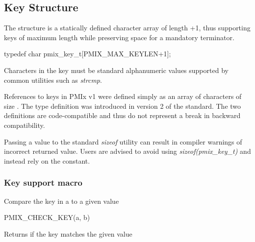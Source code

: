 \subsection{Key Structure}

The  structure is a statically defined character array of length +1, thus supporting keys of maximum length  while preserving space for a mandatory  terminator.

\cspecificstart
\begin{codepar}
typedef char pmix_key_t[PMIX_MAX_KEYLEN+1];
\end{codepar}
\cspecificend

Characters in the key must be standard alphanumeric values supported by common utilities such as \textit{strcmp}.

\adviceuserstart
References to keys in \ac{PMIx} v1 were defined simply as an array of characters of size . The  type definition was introduced in version 2 of the standard. The two definitions are code-compatible and thus do not represent a break in backward compatibility.

Passing a  value to the standard \textit{sizeof} utility can result in compiler warnings of incorrect returned value. Users are advised to avoid using \textit{sizeof(pmix_key_t)} and instead rely on the  constant.
\adviceuserend

\subsubsection{Key support macro}

Compare the key in a  to a given value

\cspecificstart
\begin{codepar}
PMIX_CHECK_KEY(a, b)
\end{codepar}
\cspecificend

\begin{arglist}
\end{arglist}

Returns  if the key matches the given value

